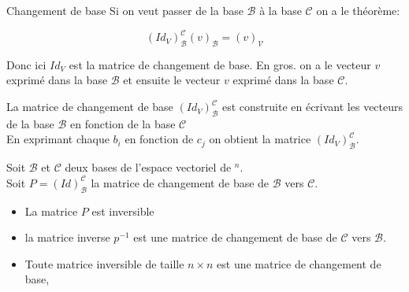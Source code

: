 \begin{parag}{Changement de base}
    Si on veut passer de la base $\mathcal{B}$ à la base $\mathcal{C}$ on a le théorème:
    \begin{truc}
        \[(Id_V)_{\mathcal{B}}^\mathcal{C}(v)_{\mathcal{B}} = (v)_{\mathcal{V}}\]
    \end{truc}
    Donc ici $Id_V$ est la matrice de changement de base. En gros. on a le vecteur $v$ exprimé dans la base $\mathcal{B}$ et ensuite le vecteur $v$ exprimé dans la base $\mathcal{C}$.
    \begin{truc}
        La matrice de changement de base $(Id_V)_{\mathcal{B}}^\mathcal{C}$ est construite en écrivant les vecteurs de la base $\mathcal{B}$ en fonction de la base $\mathcal{C}$\\
        En exprimant chaque $b_i$ en fonction de $c_j$ on obtient la matrice $(Id_V)_{\mathcal{B}}^\mathcal{C}$.
    \end{truc}
    \begin{truc}
        Soit $\mathcal{B}$ et $\mathcal{C}$ deux bases de l'espace vectoriel de \R$^n$.\\
        Soit $P = (Id)_{\mathcal{B}}^{\mathcal{C}}$ la matrice de changement de base de $\mathcal{B}$ vers $\mathcal{C}$.
        \begin{itemize}
            \item La matrice $P$ est inversible
            \item la matrice inverse $p^{-1}$ est une matrice de changement de base de $\mathcal{C}$ vers $\mathcal{B}$.
            \item Toute matrice inversible de taille $n \times n$ est une matrice de changement de base,
        \end{itemize}
    \end{truc}
\end{parag}

